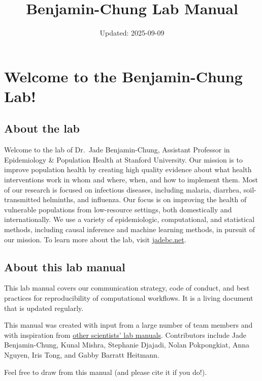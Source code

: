 \documentclass[
]{book}
\title{Benjamin-Chung Lab Manual}
\author{}
\date{\vspace{-2.5em}Updated: 2025-09-09}
\begin{document}
\maketitle

{
\setcounter{tocdepth}{1}
\tableofcontents
}
\chapter{Welcome to the Benjamin-Chung Lab!}\label{welcome-to-the-benjamin-chung-lab}

\section{About the lab}\label{about-the-lab}

Welcome to the lab of Dr.~Jade Benjamin-Chung, Assistant Professor in Epidemiology \& Population Health at Stanford University. Our mission is to improve population health by creating high quality evidence about what health interventions work in whom and where, when, and how to implement them. Most of our research is focused on infectious diseases, including malaria, diarrhea, soil-transmitted helminths, and influenza. Our focus is on improving the health of vulnerable populations from low-resource settings, both domestically and internationally. We use a variety of epidemiologic, computational, and statistical methods, including causal inference and machine learning methods, in pursuit of our mission. To learn more about the lab, visit \href{https://jadebc.net}{jadebc.net}.

\section{About this lab manual}\label{about-this-lab-manual}

This lab manual covers our communication strategy, code of conduct, and best practices for reproducibility of computational workflows. It is a living document that is updated regularly.

This manual was created with input from a large number of team members and with inspiration from \href{https://github.com/alylab/labmanual/blob/master/aly-lab-manual.pdf}{other scientists' lab manuals}.
Contributors include Jade Benjamin-Chung, Kunal Mishra, Stephanie Djajadi, Nolan Pokpongkiat, Anna Nguyen, Iris Tong, and Gabby Barratt Heitmann.

Feel free to draw from this manual (and please cite it if you do!).
\end{document}
